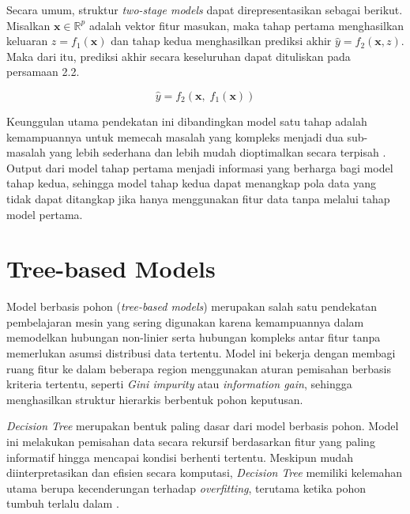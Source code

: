     Secara umum, struktur \textit{two-stage models} dapat direpresentasikan sebagai 
    berikut. Misalkan $\mathbf{x} \in \mathbb{R}^p$ adalah vektor fitur masukan, 
    maka tahap pertama menghasilkan keluaran $z = f_1(\mathbf{x})$ dan tahap kedua 
    menghasilkan prediksi akhir $\hat{y} = f_2(\mathbf{x}, z)$. Maka dari itu, 
    prediksi akhir secara keseluruhan dapat dituliskan pada persamaan 2.2.
    
    \begin{equation}
        \hat{y} = f_2\!\left(\mathbf{x},\; f_1(\mathbf{x})\right)
    \end{equation}
    
    Keunggulan utama pendekatan ini dibandingkan model satu tahap adalah kemampuannya 
    untuk memecah masalah yang kompleks menjadi dua sub-masalah yang lebih 
    sederhana dan lebih mudah dioptimalkan secara terpisah \cite{en10101547}. 
    Output dari model tahap pertama menjadi informasi yang berharga bagi model tahap kedua, sehingga model tahap kedua dapat menangkap pola data yang tidak dapat ditangkap jika hanya menggunakan fitur data tanpa melalui tahap model pertama. 
    
    \section{Tree-based Models}
    
    Model berbasis pohon (\textit{tree-based models}) merupakan salah satu pendekatan pembelajaran mesin yang sering digunakan karena kemampuannya dalam memodelkan hubungan non-linier serta hubungan kompleks antar fitur tanpa memerlukan asumsi distribusi data tertentu. Model ini bekerja dengan membagi ruang fitur ke dalam beberapa region menggunakan aturan pemisahan berbasis kriteria tertentu, seperti \textit{Gini impurity} atau \textit{information gain}, sehingga menghasilkan struktur hierarkis berbentuk pohon keputusan.
    
    \textit{Decision Tree} merupakan bentuk paling dasar dari model berbasis pohon. Model ini melakukan pemisahan data secara rekursif berdasarkan fitur yang paling informatif hingga mencapai kondisi berhenti tertentu. Meskipun mudah diinterpretasikan dan efisien secara komputasi, \textit{Decision Tree} memiliki kelemahan utama berupa kecenderungan terhadap \textit{overfitting}, terutama ketika pohon tumbuh terlalu dalam \cite{info14030140}.



